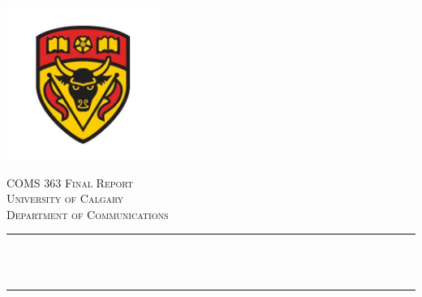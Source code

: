 \documentclass[12pt]{article}
\begin{document}
 

\begin{titlepage}

\newcommand{\HRule}{\rule{\linewidth}{0.5mm}} %

\begin{center}
\includegraphics[width=5cm]{logo}
\end{center}
 

\center %


\textsc{\LARGE COMS 363 Final Report}\\[1.5cm] %
\textsc{\Large University of Calgary}\\[0.5cm] %
\textsc{\large Department of Communications}\\[0.5cm] %

\makeatletter
\HRule \\[0.4cm]
{ \huge \bfseries \@title}\\[0.4cm] %
\HRule \\[1.5cm]
 

\end{titlepage}
\end{document}
